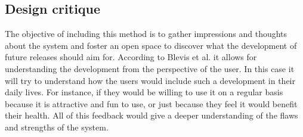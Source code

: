 \subsection{Design critique}
The objective of including this method is to gather impressions and thoughts about the system and foster an open space to discover what the development of future releases should aim for. According to Blevis et al. \cite{Blevis2007} it allows for understanding the development from the perspective of the user. In this case it will try to understand how the users would include such a development in their daily lives. For instance, if they would be willing to use it on a regular basis because it is attractive and fun to use, or just because they feel it would benefit their health. All of this feedback would give a deeper understanding of the flaws and strengths of the system.

\iffalse
\quotes{Process of discourse on many levels of the nature and effects of an ultimate particular design}. \quotes{Comment on the qualities of an ultimate particular from an holistic perspective, including reason, ethics, and aesthetics as well as minute details of form and external effects on culture}.\cite{Blevis2007}
\fi

